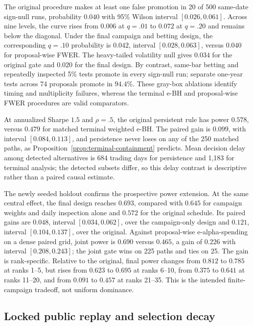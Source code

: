 The original procedure makes at least one false promotion in 20 of 500
same-date sign-null runs, probability \(0.040\) with 95\% Wilson interval
\([0.026,0.061]\).  Across nine levels, the curve rises from \(0.006\) at
\(q=.01\) to \(0.072\) at \(q=.20\) and remains below the diagonal.  Under
the final campaign and betting design, the corresponding \(q=.10\) probability
is \(0.042\), interval \([0.028,0.063]\), versus \(0.040\) for proposal-wise
FWER.  The heavy-tailed volatility null gives \(0.034\) for the original gate
and \(0.020\) for the final design.
By contrast, same-bar betting and repeatedly inspected 5\% tests promote in
every sign-null run; separate one-year tests across 74 proposals promote in
\(94.4\%\).  These gray-box ablations identify timing and multiplicity failures,
whereas the terminal e-BH and proposal-wise FWER procedures are valid
comparators.

At annualized Sharpe \(1.5\) and \(\rho=.5\), the original persistent rule has
power \(0.578\), versus \(0.479\) for matched terminal weighted e-BH.  The
paired gain is \(0.099\), with interval \([0.084,0.113]\), and persistence
never loses on any of the 250 matched paths, as
Proposition~\ref{prop:terminal-containment} predicts.  Mean decision delay
among detected alternatives is 684 trading days for persistence and 1,183
for terminal analysis; the detected subsets differ, so this delay contrast is
descriptive rather than a paired causal estimate.

The newly seeded holdout confirms the prospective power extension.  At the
same central effect, the final design reaches \(0.693\), compared with
\(0.645\) for campaign weights and daily inspection alone and \(0.572\) for
the original schedule.  Its paired gains are \(0.048\), interval
\([0.034,0.062]\), over the campaign-only design and \(0.121\), interval
\([0.104,0.137]\), over the original.  Against proposal-wise e-alpha-spending
on a dense paired grid, joint power is \(0.690\) versus \(0.465\), a gain of
\(0.226\) with interval \([0.208,0.243]\); the joint gate wins on 225 paths
and ties on 25.  The gain is rank-specific.  Relative to the original, final
power changes from \(0.812\) to \(0.785\) at ranks 1--5, but rises from
\(0.623\) to \(0.695\) at ranks 6--10, from \(0.375\) to \(0.641\) at ranks
11--20, and from \(0.091\) to \(0.457\) at ranks 21--35.  This is the intended
finite-campaign tradeoff, not uniform dominance.

\subsection{Locked public replay and selection decay}

